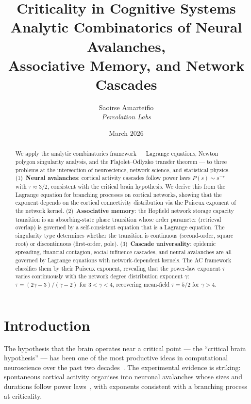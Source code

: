 \documentclass[11pt,a4paper]{article}
\title{%
\textbf{Criticality in Cognitive Systems}\\[0.5em]
\large Analytic Combinatorics of Neural Avalanches,\\
Associative Memory, and Network Cascades
}
\author{
Saoirse Amarteifio\\
\small \textit{Percolation Labs}
}
\date{March 2026}
\theoremstyle{definition}
\begin{document}
\maketitle

\begin{abstract}
We apply the analytic combinatorics framework --- Lagrange equations,
Newton polygon singularity analysis, and the Flajolet--Odlyzko transfer
theorem --- to three problems at the intersection of neuroscience,
network science, and statistical physics.
(1)~\textbf{Neural avalanches}: cortical activity cascades follow power
laws $P(s) \sim s^{-\tau}$ with $\tau \approx 3/2$, consistent with the
critical brain hypothesis. We derive this from the Lagrange equation for
branching processes on cortical networks, showing that the exponent depends
on the cortical connectivity distribution via the Puiseux exponent of the
network kernel.
(2)~\textbf{Associative memory}: the Hopfield network storage capacity
transition is an absorbing-state phase transition whose order parameter
(retrieval overlap) is governed by a self-consistent equation that is a
Lagrange equation. The singularity type determines whether the transition
is continuous (second-order, square root) or discontinuous (first-order, pole).
(3)~\textbf{Cascade universality}: epidemic spreading, financial contagion,
social influence cascades, and neural avalanches are all governed by
Lagrange equations with network-dependent kernels. The AC framework
classifies them by their Puiseux exponent, revealing that the power-law
exponent $\tau$ varies continuously with the network degree distribution
exponent $\gamma$:
$\tau = (2\gamma - 3)/(\gamma - 2)$ for $3 < \gamma < 4$,
recovering mean-field $\tau = 5/2$ for $\gamma > 4$.
\end{abstract}

\tableofcontents
\clearpage

\section{Introduction}
\label{sec:intro}

The hypothesis that the brain operates near a critical point --- the
``critical brain hypothesis'' --- has been one of the most productive
ideas in computational neuroscience over the past two
decades~\cite{beggs2003,chialvo2010,munoz2018}. The experimental
evidence is striking: spontaneous cortical activity organises into
neuronal avalanches whose sizes and durations follow power
laws~\cite{beggs2003}, with exponents consistent with a branching
process at criticality.
\end{document}
